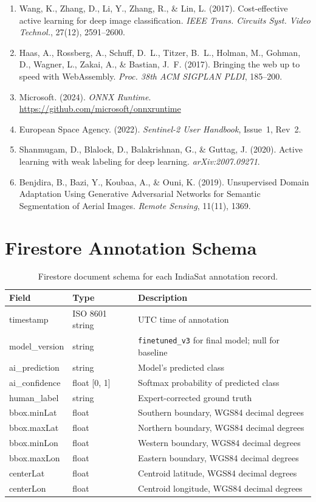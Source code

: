 \documentclass[journal]{IEEEtran}
\begin{document}
\begin{enumerate}
\item Wang, K., Zhang, D., Li, Y., Zhang, R., \& Lin, L. (2017).
  Cost-effective active learning for deep image classification. \emph{IEEE
  Trans. Circuits Syst. Video Technol.}, 27(12), 2591--2600.
\item Haas, A., Rossberg, A., Schuff, D.~L., Titzer, B.~L., Holman, M.,
  Gohman, D., Wagner, L., Zakai, A., \& Bastian, J.~F. (2017). Bringing the
  web up to speed with WebAssembly. \emph{Proc. 38th ACM SIGPLAN PLDI},
  185--200.
\item Microsoft. (2024). \emph{ONNX Runtime}. \url{https://github.com/microsoft/onnxruntime}
\item European Space Agency. (2022). \emph{Sentinel-2 User Handbook},
  Issue~1, Rev~2.
\item Shanmugam, D., Blalock, D., Balakrishnan, G., \& Guttag, J. (2020).
  Active learning with weak labeling for deep learning.
  \emph{arXiv:2007.09271}.
\item Benjdira, B., Bazi, Y., Koubaa, A., \& Ouni, K. (2019). Unsupervised
  Domain Adaptation Using Generative Adversarial Networks for Semantic
  Segmentation of Aerial Images. \emph{Remote Sensing}, 11(11), 1369.
\end{enumerate}

\appendix
\section{Firestore Annotation Schema}

\begin{longtable}[]{@{}lll@{}}
\caption{Firestore document schema for each IndiaSat annotation record.}\\
\toprule\noalign{}
Field & Type & Description \\
\midrule\noalign{}
\endhead
\bottomrule\noalign{}
\endlastfoot
timestamp & ISO 8601 string & UTC time of annotation \\
model\_version & string & \texttt{finetuned\_v3} for final model; null for baseline \\
ai\_prediction & string & Model's predicted class \\
ai\_confidence & float [0, 1] & Softmax probability of predicted class \\
human\_label & string & Expert-corrected ground truth \\
bbox.minLat & float & Southern boundary, WGS84 decimal degrees \\
bbox.maxLat & float & Northern boundary, WGS84 decimal degrees \\
bbox.minLon & float & Western boundary, WGS84 decimal degrees \\
bbox.maxLon & float & Eastern boundary, WGS84 decimal degrees \\
centerLat & float & Centroid latitude, WGS84 decimal degrees \\
centerLon & float & Centroid longitude, WGS84 decimal degrees \\
\end{longtable}
\end{document}
